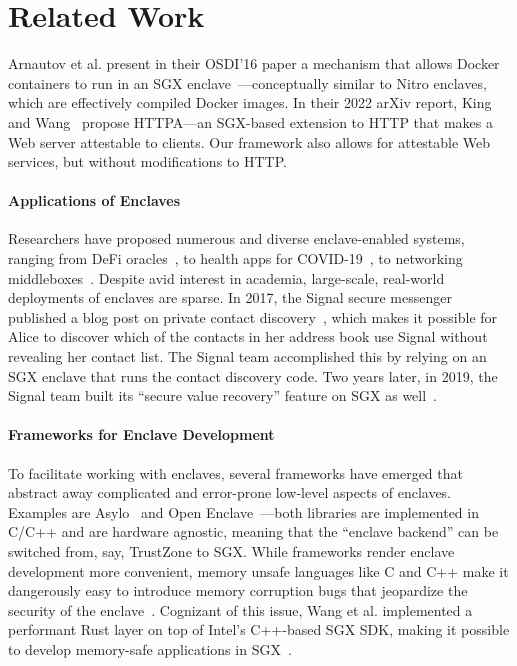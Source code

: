 \section{Related Work}
\label{sec:related-work}

Arnautov et al. present in their OSDI'16 paper a mechanism that allows Docker
containers to run in an SGX enclave~\cite{Arnautov2016a}---conceptually similar
to Nitro enclaves, which are effectively compiled Docker images.
%
In their 2022 arXiv report, King and Wang~\cite{King2022a} propose HTTPA---an
SGX-based extension to HTTP that makes a Web server attestable to clients.  Our
framework also allows for attestable Web services, but without modifications to
HTTP.

\paragraph{Applications of Enclaves}

Researchers have proposed numerous and diverse enclave-enabled systems, ranging
from DeFi oracles~\cite{Zhang16a}, to health apps for
COVID-19~\cite{Mailthody21a}, to networking middleboxes~\cite{Han17a}.  Despite
avid interest in academia, large-scale, real-world deployments of enclaves are
sparse.  In 2017, the Signal secure messenger published a blog post on private
contact discovery~\cite{Marlinspike17a}, which makes it possible for Alice to
discover which of the contacts in her address book use Signal without revealing
her contact list.  The Signal team accomplished this by relying on an SGX
enclave that runs the contact discovery code.  Two years later, in 2019, the
Signal team built its ``secure value recovery'' feature on SGX as
well~\cite{Lund19a}.

\paragraph{Frameworks for Enclave Development}

To facilitate working with enclaves, several frameworks have emerged that
abstract away complicated and error-prone low-level aspects of enclaves.
Examples are Asylo~\cite{asylo} and Open Enclave~\cite{openenclave}---both
libraries are implemented in C/C++ and are hardware agnostic, meaning that the
``enclave backend'' can be switched from, say, TrustZone to SGX.  While
frameworks render enclave development more convenient, memory unsafe languages
like C and C++ make it dangerously easy to introduce memory corruption bugs
that jeopardize the security of the enclave~\cite{Lee2017a}.  Cognizant of
this issue, Wang et al. implemented a performant Rust layer on top of Intel's
C++-based SGX SDK, making it possible to develop memory-safe applications in
SGX~\cite{Wang2019a}.

